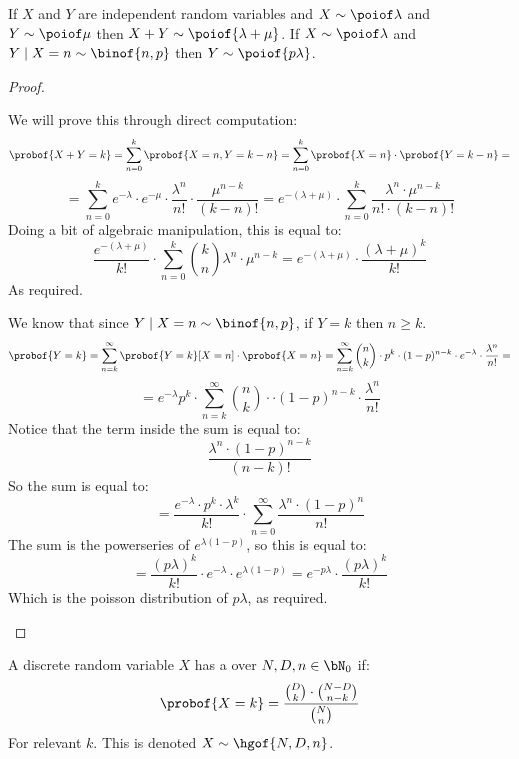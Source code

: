 \begin{prop*}

	\begin{msecenumerate}[0pt]
		\mitem If $X$ and $Y$ are independent random variables and $X\sim\poiof\lambda$ and $Y\sim\poiof\mu$ then
			$X+Y\sim\poiof{\lambda+\mu}$.
		\mitem If $X\sim\poiof\lambda$ and $Y\mid X=n\sim\binof{n,p}$ then $Y\sim\poiof{p\lambda}$.
	\end{msecenumerate}

\end{prop*}

\begin{proof}

	\begin{msecenumerate}[0pt]
		\mitem We will prove this through direct computation:
			\[ \probof{X+Y=k} = \sum_{n=0}^k \probof{X=n, Y=k-n} = \sum_{n=0}^k\probof{X=n}\cdot\probof{Y=k-n} = \]
			\[ = \sum_{n=0}^k e^{-\lambda}\cdot e^{-\mu} \cdot \frac{\lambda^n}{n!}\cdot\frac{\mu^{n-k}}{(k-n)!} 
			 = e^{-(\lambda+\mu)}\cdot\sum_{n=0}^k\frac{\lambda^n\cdot\mu^{n-k}}{n!\cdot(k-n)!} \]
			Doing a bit of algebraic manipulation, this is equal to:
			\[ \frac{e^{-(\lambda+\mu)}}{k!}\cdot\sum_{n=0}^k\binom kn \lambda^n\cdot\mu^{n-k} =
			e^{-(\lambda+\mu)}\cdot\frac{(\lambda+\mu)^k}{k!} \]
			As required.

		\mitem We know that since $Y\mid X=n\sim\binof{n,p}$, if $Y=k$ then $n\geq k$.
			\[ \probof{Y=k} = \sum_{n=k}^\infty \probof{Y=k}[X=n]\cdot\probof{X=n} =
			\sum_{n=k}^\infty \binom nk\cdot p^k\cdot(1-p)^{n-k}\cdot e^{-\lambda}\cdot\frac{\lambda^n}{n!} = \]
			\[ = e^{-\lambda}p^k\cdot\sum_{n=k}^\infty\binom nk\cdot \cdot(1-p)^{n-k}\cdot\frac{\lambda^n}{n!} \]
			Notice that the term inside the sum is equal to:
			\[ \frac{\lambda^n\cdot(1-p)^{n-k}}{(n-k)!} \]
			So the sum is equal to:
			\[ = \frac{e^{-\lambda}\cdot p^k\cdot \lambda^k}{k!}\cdot\sum_{n=0}^\infty\frac{\lambda^n\cdot(1-p)^n}{n!} \]
			The sum is the powerseries of $e^{\lambda(1-p)}$, so this is equal to:
			\[ = \frac{(p\lambda)^k}{k!}\cdot e^{-\lambda}\cdot e^{\lambda(1-p)} = e^{-p\lambda}\cdot\frac{(p\lambda)^k}{k!} \]
			Which is the poisson distribution of $p\lambda$, as required.
	\end{msecenumerate}

\end{proof}

\begin{defn*}

	A discrete random variable $X$ has a  over $N,D,n\in\bN_0$ if:
	\[ \probof{X=k} = \dfrac{\binom Dk\cdot\binom{N-D}{n-k}}{\binom Nn} \]
	For relevant $k$.
	This is denoted $X\sim\hgof{N,D,n}$.

\end{defn*}

